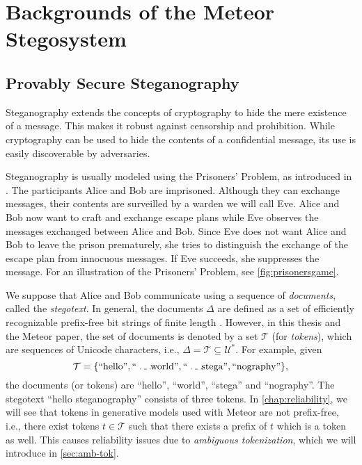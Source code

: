 \chapter{Backgrounds of the Meteor Stegosystem}
\label{chap:previous-work}

\section{Provably Secure Steganography}
\label{sec:prov-sec-steg}

Steganography extends the concepts of cryptography to hide the mere existence of a message.
This makes it robust against censorship and prohibition.
While cryptography can be used to hide the contents of a confidential message, its use is easily discoverable by adversaries.


Steganography is usually modeled using the Prisoners' Problem, as introduced in \cite{Simmons1983}.
The participants Alice and Bob are imprisoned.
Although they can exchange messages, their contents are surveilled by a warden we will call Eve.
Alice and Bob now want to craft and exchange escape plans while Eve observes the messages exchanged between Alice and Bob.
Since Eve does not want Alice and Bob to leave the prison prematurely, she tries to distinguish the exchange of the escape plan from innocuous messages.
If Eve succeeds, she suppresses the message.
For an illustration of the Prisoners' Problem, see \autoref{fig:prisonersgame}.

We suppose that Alice and Bob communicate using a sequence of \emph{documents}, called the \emph{stegotext}.
In general, the documents $\Delta$ are defined as a set of efficiently recognizable prefix-free bit strings of finite length \cite{Hopper2008}.
However, in this thesis and the Meteor paper, the set of documents is denoted by a set $\mathcal{T}$ (for \emph{tokens}), which are sequences of Unicode characters, i.e., $\Delta = \mathcal{T} \subseteq \mathcal{U}^*$. For example, given
$$\mathcal{T} = \{ \textrm{``hello''}, \textrm{``\Vtextvisiblespace world''}, \textrm{``\Vtextvisiblespace stega''}, \textrm{``nography''} \},$$ the documents (or tokens) are ``hello'', ``\Vtextvisiblespace world'', ``\Vtextvisiblespace stega'' and ``nography''.  
The stegotext ``hello steganography'' consists of three tokens.
In \autoref{chap:reliability}, we will see that tokens in generative models used with Meteor are not prefix-free, i.e., there exist tokens $t \in \mathcal{T}$ such that there exists a prefix of $t$ which is a token as well.
This causes reliability issues due to \emph{ambiguous tokenization}, which we will introduce in \autoref{sec:amb-tok}.

